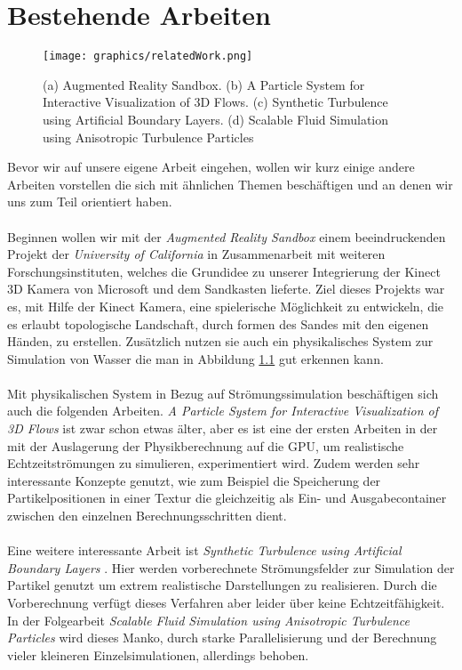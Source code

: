 \chapter{Bestehende Arbeiten}
\begin{Spacing}{\mylinespace}
\begin{figure}[h!]
	\centering
	\texttt{[image: graphics/relatedWork.png]}
	\caption{(a) Augmented Reality Sandbox. (b) A Particle System
for Interactive Visualization of 3D Flows. (c) Synthetic Turbulence using Artificial Boundary Layers. (d) Scalable Fluid Simulation using Anisotropic Turbulence Particles}
	\label{fig:relatedWork}
\end{figure}
Bevor wir auf unsere eigene Arbeit eingehen, wollen wir kurz einige andere Arbeiten vorstellen die sich mit ähnlichen Themen beschäftigen und an denen wir uns zum Teil orientiert haben.
\\\\
Beginnen wollen wir mit der \textit{Augmented Reality Sandbox} \cite{Kre10} einem beeindruckenden Projekt der \textit{University of California} in Zusammenarbeit mit weiteren Forschungsinstituten, welches die Grundidee zu unserer Integrierung der Kinect 3D Kamera von Microsoft und dem Sandkasten lieferte. Ziel dieses Projekts war es, mit Hilfe der Kinect Kamera, eine spielerische Möglichkeit zu entwickeln, die es erlaubt topologische Landschaft, durch formen des Sandes mit den eigenen Händen, zu erstellen. Zusätzlich nutzen sie auch ein physikalisches System zur Simulation von Wasser die man in Abbildung \ref{fig:relatedWork} gut erkennen kann.
\\\\
Mit physikalischen System in Bezug auf Strömungssimulation beschäftigen sich auch die folgenden Arbeiten. \textit{A Particle System
for Interactive Visualization of 3D Flows} \cite{Kru05} ist zwar schon etwas älter, aber es ist eine der ersten Arbeiten in der mit der Auslagerung der Physikberechnung auf die GPU, um realistische Echtzeitströmungen zu simulieren, experimentiert wird. Zudem werden sehr interessante Konzepte genutzt, wie zum Beispiel die Speicherung der Partikelpositionen in einer Textur die gleichzeitig als Ein- und Ausgabecontainer zwischen den einzelnen Berechnungsschritten dient.
\\\\
Eine weitere interessante Arbeit ist \textit{Synthetic Turbulence using Artificial Boundary Layers} \cite{Pfa09}. Hier werden vorberechnete Strömungsfelder zur Simulation der Partikel genutzt um  extrem realistische Darstellungen zu realisieren. Durch die Vorberechnung verfügt dieses Verfahren aber leider über keine Echtzeitfähigkeit. In der Folgearbeit \textit{Scalable Fluid Simulation using Anisotropic Turbulence Particles} \cite{Pfa10} wird dieses Manko, durch starke Parallelisierung und der Berechnung vieler kleineren Einzelsimulationen, allerdings behoben.



\end{Spacing}
\newpage
\clearpage
